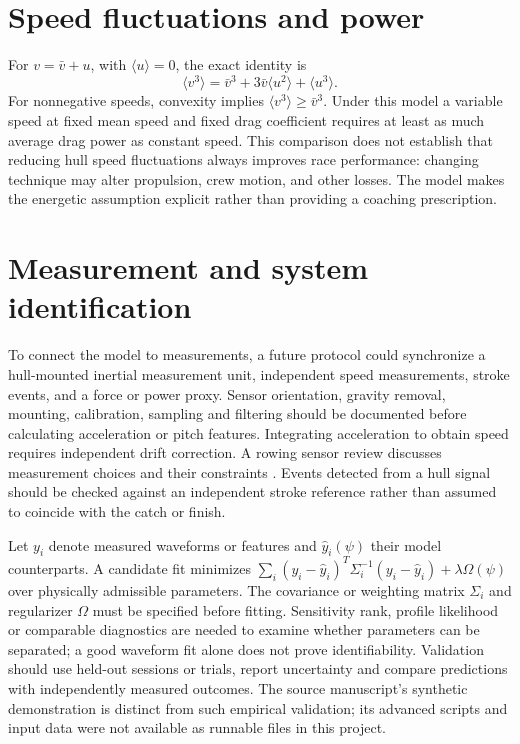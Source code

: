 \documentclass[11pt]{article}
\begin{document}
\section{Speed fluctuations and power}
For $v=\bar v+u$, with $\langle u\rangle=0$, the exact identity is
\begin{equation}\langle v^3\rangle=\bar v^3+3\bar v\langle u^2\rangle+\langle u^3\rangle.\end{equation}
For nonnegative speeds, convexity implies $\langle v^3\rangle\geq\bar v^3$. Under this model a variable speed at fixed mean speed and fixed drag coefficient requires at least as much average drag power as constant speed. This comparison does not establish that reducing hull speed fluctuations always improves race performance: changing technique may alter propulsion, crew motion, and other losses. The model makes the energetic assumption explicit rather than providing a coaching prescription.

\section{Measurement and system identification}
To connect the model to measurements, a future protocol could synchronize a hull-mounted inertial measurement unit, independent speed measurements, stroke events, and a force or power proxy. Sensor orientation, gravity removal, mounting, calibration, sampling and filtering should be documented before calculating acceleration or pitch features. Integrating acceleration to obtain speed requires independent drift correction. A rowing sensor review discusses measurement choices and their constraints \cite{worsey}. Events detected from a hull signal should be checked against an independent stroke reference rather than assumed to coincide with the catch or finish.

Let $y_i$ denote measured waveforms or features and $\hat y_i(\psi)$ their model counterparts. A candidate fit minimizes $\sum_i (y_i-\hat y_i)^T\Sigma_i^{-1}(y_i-\hat y_i)+\lambda\Omega(\psi)$ over physically admissible parameters. The covariance or weighting matrix $\Sigma_i$ and regularizer $\Omega$ must be specified before fitting. Sensitivity rank, profile likelihood or comparable diagnostics are needed to examine whether parameters can be separated; a good waveform fit alone does not prove identifiability. Validation should use held-out sessions or trials, report uncertainty and compare predictions with independently measured outcomes. The source manuscript's synthetic demonstration is distinct from such empirical validation; its advanced scripts and input data were not available as runnable files in this project.
\end{document}
